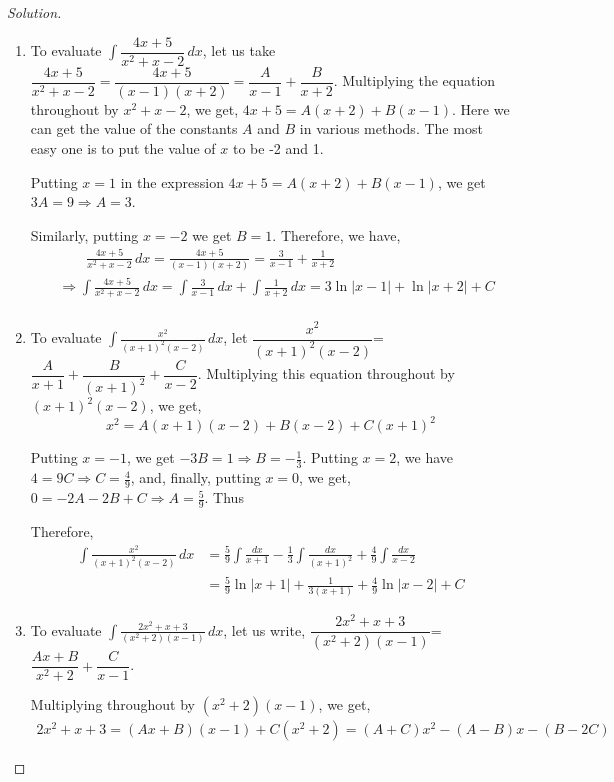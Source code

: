 \documentclass{book}
\theoremstyle{definition}
\newenvironment{solution}
    {\begin{proof}[Solution]}
    {\end{proof}}
\begin{document}
\begin{solution}
\begin{enumerate}[label=(\roman*)]
\item To evaluate $\int \dfrac{4x+5}{x^2+x-2}\,dx$, let us take $\dfrac{4x+5}{x^2+x-2}=\dfrac{4x+5}{(x-1)(x+2)}=\dfrac{A}{x-1}+\dfrac{B}{x+2}$. Multiplying the equation throughout by $x^2+x-2$, we get, $4x+5=A(x+2)+B(x-1)$. Here we can get the value of the constants $A$ and $B$ in various methods. The most easy one is to put the value of $x$ to be -2 and 1. 

Putting $x=1$ in the expression $4x+5=A(x+2)+B(x-1)$, we get $3A=9 \Rightarrow A=3$.


Similarly, putting $x=-2$ we get $B=1$. Therefore, we have,
\begin{align*}
    &\qquad \frac{4x+5}{x^2+x-2}\,dx = \frac{4x+5}{(x-1)(x+2)} = \frac{3}{x-1}+\frac{1}{x+2} \\
    &\Rightarrow \int\frac{4x+5}{x^2+x-2}\,dx = \int\frac{3}{x-1}\,dx+\int\frac{1}{x+2}\,dx = 3\ln|x-1|+\ln|x+2|+C \\
\end{align*}
 
\item To evaluate $\displaystyle\int\frac{x^2}{(x+1)^2(x-2)}\,dx$, let 
$\dfrac{x^2}{(x+1)^2(x-2)}$=$\dfrac{A}{x+1}+\dfrac{B}{(x+1)^2}+\dfrac{C}{x-2}$. 
\newline
Multiplying this equation throughout by $(x+1)^2(x-2)$, we get,
\[
x^2=A(x+1)(x-2)+B(x-2)+C(x+1)^2
\]

Putting $x=-1$, we get $-3B=1\Rightarrow B=-\frac{1}{3}$. Putting $x=2$, we have $4=9C\Rightarrow C=\frac{4}{9}$, and, finally, putting $x=0$, we get, $0=-2A-2B+C\Rightarrow A=\frac{5}{9}$. Thus 

Therefore, 
\begin{align*}
    \int\frac{x^2}{(x+1)^2(x-2)}\,dx &= \frac{5}{9}\int\frac{dx}{x+1}-\frac{1}{3}\int\frac{dx}{(x+1)^2}+\frac{4}{9}\int\frac{dx}{x-2} \\ 
    &= \frac{5}{9}\ln|x+1|+\frac{1}{3(x+1)}+\frac{4}{9}\ln|x-2|+C
\end{align*}

\item To evaluate $\displaystyle\int\frac{2x^2+x+3}{(x^2+2)(x-1)}\,dx$, let us write, $\dfrac{2x^2+x+3}{(x^2+2)(x-1)}$=$\dfrac{Ax+B}{x^2+2}+\dfrac{C}{x-1}$. 

Multiplying throughout by $(x^2+2)(x-1)$, we get, 
\begin{align*}
2x^2+x+3 = (Ax+B)(x-1)+C(x^2+2) = (A+C)x^2-(A-B)x-(B-2C)
\end{align*}


\end{enumerate}
\end{solution}
\end{document}
